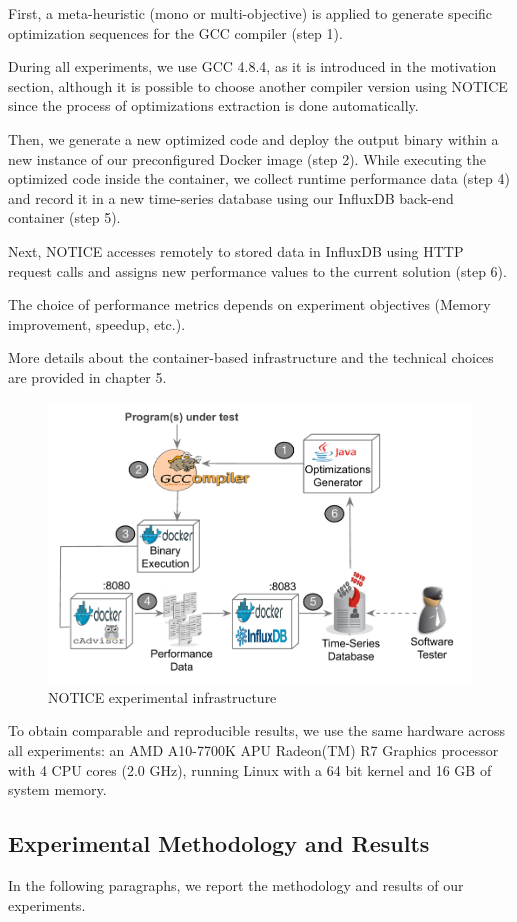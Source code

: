 First, a meta-heuristic (mono or multi-objective) is applied to generate specific optimization sequences for the GCC compiler (step 1).

During all experiments, we use GCC 4.8.4, as it is introduced in the motivation section, although it is possible to choose another compiler version using NOTICE since the process of optimizations extraction is done automatically. 

Then, we generate a new optimized code and deploy the output binary within a new instance of our preconfigured Docker image (step 2). While executing the optimized code inside the container, we collect runtime performance data (step 4) and record it in a new time-series database using our InfluxDB back-end container (step 5). 

Next, NOTICE accesses remotely to stored data in InfluxDB using HTTP request calls and assigns new performance values to the current solution (step 6). 

The choice of performance metrics depends on experiment objectives (Memory improvement, speedup, etc.).

More details about the container-based infrastructure and the technical choices are provided in chapter 5.

\begin{figure}[h]
	\centering
	\includegraphics[width=0.8\linewidth]{chapitre3/fig/infraup.pdf}
	\caption{NOTICE experimental infrastructure}
\end{figure}

To obtain comparable and reproducible results, we use the same hardware across all experiments: an AMD A10-7700K APU Radeon(TM) R7 Graphics processor with 4 CPU cores (2.0 GHz), running Linux with a 64 bit kernel and 16 GB of system memory.


\subsection{Experimental Methodology and Results}
In the following paragraphs, we report the methodology and results of our experiments.

